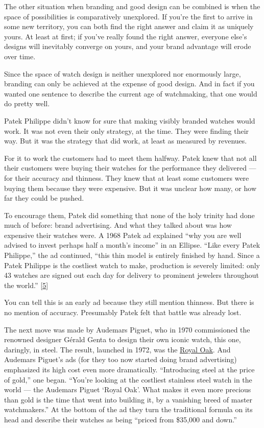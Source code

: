 The other situation when branding and good design can be combined is
when the space of possibilities is comparatively unexplored. If you're
the first to arrive in some new territory, you can both find the right
answer and claim it as uniquely yours. At least at first; if you've
really found the right answer, everyone else's designs will inevitably
converge on yours, and your brand advantage will erode over time.

Since the space of watch design is neither unexplored nor enormously
large, branding can only be achieved at the expense of good design. And
in fact if you wanted one sentence to describe the current age of
watchmaking, that one would do pretty well.

Patek Philippe didn't know for sure that making visibly branded watches
would work. It was not even their only strategy, at the time. They were
finding their way. But it was the strategy that did work, at least as
measured by revenues.

For it to work the customers had to meet them halfway. Patek knew that
not all their customers were buying their watches for the performance
they delivered --- for their accuracy and thinness. They knew that at
least some customers were buying them because they were expensive. But
it was unclear how many, or how far they could be pushed.

To encourage them, Patek did something that none of the holy trinity had
done much of before: brand advertising. And what they talked about was
how expensive their watches were. A 1968 Patek ad explained ``why you
are well advised to invest perhaps half a month's income'' in an
Ellipse. ``Like every Patek Philippe,'' the ad continued, ``this thin
model is entirely finished by hand. Since a Patek Philippe is the
costliest watch to make, production is severely limited: only 43 watches
are signed out each day for delivery to prominent jewelers throughout
the world.'' {[}\hyperref[f5n]{5}{]}

You can tell this is an early ad because they still mention thinness.
But there is no mention of accuracy. Presumably Patek felt that battle
was already lost.

The next move was made by Audemars Piguet, who in 1970 commissioned the
renowned designer Gérald Genta to design their own iconic watch, this
one, daringly, in steel. The result, launched in 1972, was the
\href{https://www.sothebys.com/en/buy/auction/2025/fine-watches-5/reference-5402st-jumbo-royal-oak-a-series-a}{Royal
Oak}. And Audemars Piguet's ads (for they too now started doing brand
advertising) emphasized its high cost even more dramatically.
``Introducing steel at the price of gold,'' one began. ``You're looking
at the costliest stainless steel watch in the world --- the Audemars
Piguet `Royal Oak'. What makes it even more precious than gold is the
time that went into building it, by a vanishing breed of master
watchmakers.'' At the bottom of the ad they turn the traditional formula
on its head and describe their watches as being ``priced from \$35,000
and down.''

